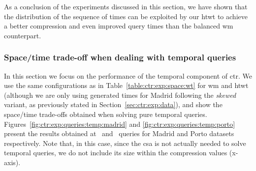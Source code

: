

	As a conclusion of the experiments discussed in this section, we have shown that
	the distribution of the sequence of times can be
	exploited by our \gls{htwt} to achieve a better compression and even improved
	query times than the balanced \gls{wm} counterpart.


	\subsubsection{Space/time trade-off when dealing with temporal  queries}
	\label{sec:ctr:exp:queries:temp}

	In this section we focus on the performance of the temporal component of \gls{ctr}. We use the same 
	configurations as in Table~\ref{table:ctr:exp:space:wt} for \gls{wm} and \gls{htwt} (although we are only using generated times for Madrid following the \textit{skewed} variant, as previously stated in Section~\ref{sec:ctr:exp:data}), and 
	show the space/time trade-offs obtained when solving pure temporal queries. Figures~\ref{fig:ctr:exp:queries:temp:madrid}
	and \ref{fig:ctr:exp:queries:temp:porto} present the results obtained at  \loadT\ and \startT\ queries for Madrid and Porto datasets respectively. 
	Note that, in this case, since the \gls{csa} is not actually needed to solve temporal queries, we do not include its size
	within the compression values (x-axis). 

